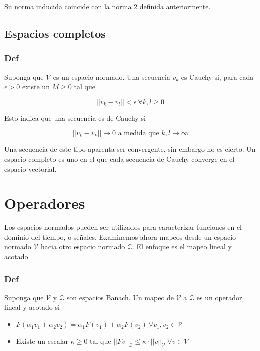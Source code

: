 Su norma inducida coincide con la norma 2 definida anteriormente.

\subsection{Espacios completos}

\subsubsection{Def} Suponga que $\mathcal{V}$ es un espacio normado. Una secuencia $v_k$ es Cauchy si, para cada $\epsilon > 0$ existe un $M \geq 0$ tal que

\begin{equation*}
    ||v_k - v_l|| < \epsilon \ \forall k,l \geq 0
\end{equation*}

Esto indica que una secuencia es de Cauchy si 

\begin{equation*}
    ||v_k - v_k|| \to 0 \text{ a medida que } k,l \to \infty
\end{equation*}


Una secuencia de este tipo aparenta ser convergente, sin embargo no es cierto. Un espacio completo es uno en el que cada secuencia de Cauchy converge en el espacio vectorial. 

\section{Operadores}

Los espacios normados pueden ser utilizados para caracterizar funciones en el dominio del tiempo, o señales. Examinemos ahora mapeos desde un espacio normado $\mathcal{V}$ hacia otro espacio normado $\mathcal{Z}$. El enfoque es el mapeo lineal y acotado.

\subsubsection{Def} Suponga que $\mathcal{V}$ y $\mathcal{Z}$ son espacios Banach. Un mapeo de $\mathcal{V}$ a $\mathcal{Z}$ es un operador lineal y acotado si

\begin{itemize}
    \item $F(\alpha_1 v_1 + \alpha_2 v_2 ) = \alpha_1 F(v_1) + \alpha_2 F(v_2) \ \forall v_1,v_2 \in \mathcal{V}$
    \item Existe un escalar $\kappa \geq 0$ tal que $||Fv||_{\mathcal{Z}} \leq \kappa \cdot ||v||_\mathcal{V} \ \forall v \in \mathcal{V}$
\end{itemize}

